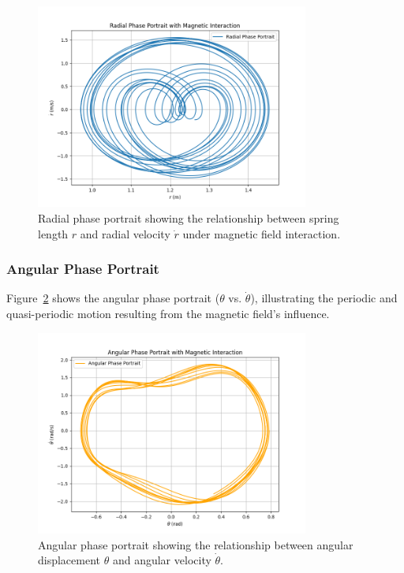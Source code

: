 \documentclass[12pt]{article}
\begin{document}
\begin{figure}[h!]
    \centering
    \includegraphics[width=0.8\textwidth]{radial_phase_portrait_fieldLines.png}
    \caption{Radial phase portrait showing the relationship between spring length \( r \) and radial velocity \( \dot{r} \) under magnetic field interaction.}
    \label{fig:radial_phase_portrait_fieldLines}
\end{figure}

\subsubsection{Angular Phase Portrait}
Figure~\ref{fig:angular_phase_portrait_fieldLines} shows the angular phase portrait (\( \theta \) vs. \( \dot{\theta} \)), illustrating the periodic and quasi-periodic motion resulting from the magnetic field's influence.

\begin{figure}[h!]
    \centering
    \includegraphics[width=0.8\textwidth]{angular_phase_portrait_fieldLines.png}
    \caption{Angular phase portrait showing the relationship between angular displacement \( \theta \) and angular velocity \( \dot{\theta} \).}
    \label{fig:angular_phase_portrait_fieldLines}
\end{figure}
\end{document}
